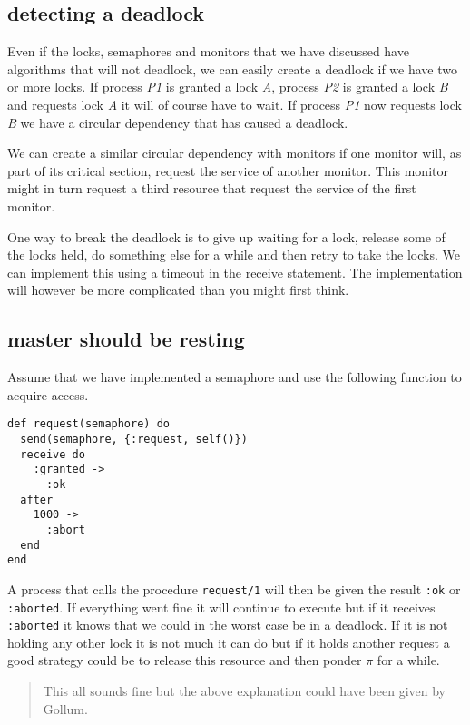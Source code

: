 \documentclass[a4paper,11pt]{article}
\begin{document}
\subsection{detecting a deadlock}

Even if the locks, semaphores and monitors that we have discussed have
algorithms that will not deadlock, we can easily create a deadlock if
we have two or more locks. If process {\em P1} is granted a lock {\em
  A}, process {\em P2} is granted a lock {\em B} and requests lock
{\em A} it will of course have to wait. If process {\em P1} now
requests lock {\em B} we have a circular dependency that has caused a
deadlock.

We can create a similar circular dependency with monitors if one
monitor will, as part of its critical section, request the service of
another monitor. This monitor might in turn request a third resource
that request the service of the first monitor.

One way to break the deadlock is to give up waiting for a lock,
release some of the locks held, do something else for a while and then
retry to take the locks. We can implement this using a timeout in the
receive statement. The implementation will however be more complicated
than you might first think.


\subsection{master should be resting}

Assume that we have implemented a semaphore and use the following
function to acquire access.

\begin{verbatim}
def request(semaphore) do
  send(semaphore, {:request, self()})
  receive do
    :granted ->
      :ok
  after
    1000 ->
      :abort
  end
end
\end{verbatim}

A process that calls the procedure {\tt request/1} will then be given
the result {\tt :ok} or {\tt :aborted}. If everything went fine it will
continue to execute but if it receives {\tt :aborted} it knows that we
could in the worst case be in a deadlock. If it is not holding any
other lock it is not much it can do but if it holds another request a
good strategy could be to release this resource and then ponder $\pi$
for a while.

\begin{quotation}
This all sounds fine but the above explanation could have been given
by Gollum.
\end{quotation}
\end{document}
